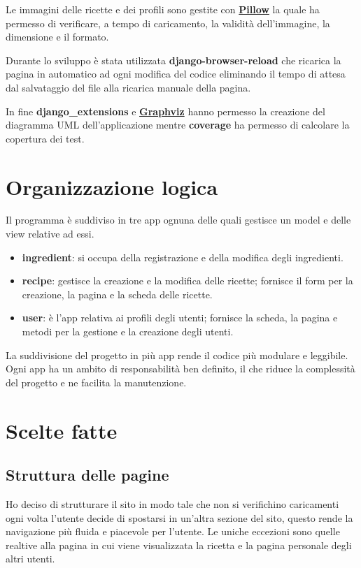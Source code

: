 \documentclass[a4paper]{article}
\begin{document}
        Le immagini delle ricette e dei profili sono gestite con \href{https://python-pillow.org/}{\textbf{Pillow}}
        la quale ha permesso di verificare, a tempo di caricamento, la validità dell'immagine, la dimensione 
        e il formato.
        
        Durante lo sviluppo è stata utilizzata \textbf{django-browser-reload} che ricarica 
        la pagina in automatico ad ogni modifica del codice eliminando il tempo di attesa 
        dal salvataggio del file alla ricarica manuale della pagina.
        
        In fine \textbf{django\_extensions} e \href{https://graphviz.org/}{\textbf{Graphviz}} 
        hanno permesso la creazione del diagramma UML dell'applicazione mentre \textbf{coverage} 
        ha permesso di calcolare la copertura dei test.
    
    
    \section{Organizzazione logica}
        Il programma è suddiviso in tre app ognuna delle quali gestisce un model e 
        delle view relative ad essi.
        
        \begin{itemize}
            \item \textbf{ingredient}: si occupa della registrazione e della modifica 
            degli ingredienti.
            
            \item \textbf{recipe}: gestisce la creazione e la modifica delle ricette;
            fornisce il form per la creazione, la pagina e la scheda delle ricette.
            
            \item \textbf{user}: è l'app relativa ai profili degli utenti; 
            fornisce la scheda, la pagina e metodi per la gestione e la creazione degli utenti.
        \end{itemize}
        
        La suddivisione del progetto in più app rende il codice più modulare e leggibile. 
        Ogni app ha un ambito di responsabilità ben definito, il che riduce la complessità 
        del progetto e ne facilita la manutenzione.
    
    
    \section{Scelte fatte}
        \subsection{Struttura delle pagine}
            Ho deciso di strutturare il sito in modo tale che non si verifichino caricamenti ogni 
            volta l'utente decide di spostarsi in un'altra sezione del sito, questo rende la navigazione 
            più fluida e piacevole per l'utente.
            Le uniche eccezioni sono quelle realtive alla pagina in cui viene visualizzata 
            la ricetta e la pagina personale degli altri utenti.
        
\end{document}
